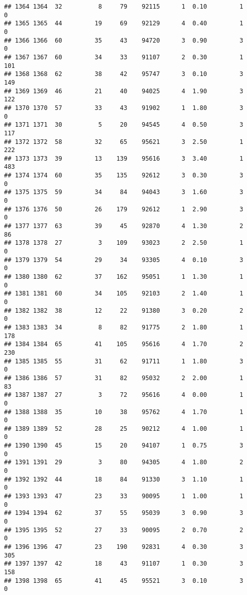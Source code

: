 \documentclass[
]{article}
\begin{document}
\begin{verbatim}
## 1364 1364  32          8     79    92115      1  0.10         1        0
## 1365 1365  44         19     69    92129      4  0.40         1        0
## 1366 1366  60         35     43    94720      3  0.90         3        0
## 1367 1367  60         34     33    91107      2  0.30         1      101
## 1368 1368  62         38     42    95747      3  0.10         3      149
## 1369 1369  46         21     40    94025      4  1.90         3      122
## 1370 1370  57         33     43    91902      1  1.80         3        0
## 1371 1371  30          5     20    94545      4  0.50         3      117
## 1372 1372  58         32     65    95621      3  2.50         1      222
## 1373 1373  39         13    139    95616      3  3.40         1      483
## 1374 1374  60         35    135    92612      3  0.30         3        0
## 1375 1375  59         34     84    94043      3  1.60         3        0
## 1376 1376  50         26    179    92612      1  2.90         3        0
## 1377 1377  63         39     45    92870      4  1.30         2       86
## 1378 1378  27          3    109    93023      2  2.50         1        0
## 1379 1379  54         29     34    93305      4  0.10         3        0
## 1380 1380  62         37    162    95051      1  1.30         1        0
## 1381 1381  60         34    105    92103      2  1.40         1        0
## 1382 1382  38         12     22    91380      3  0.20         2        0
## 1383 1383  34          8     82    91775      2  1.80         1      178
## 1384 1384  65         41    105    95616      4  1.70         2      230
## 1385 1385  55         31     62    91711      1  1.80         3        0
## 1386 1386  57         31     82    95032      2  2.00         1       83
## 1387 1387  27          3     72    95616      4  0.00         1        0
## 1388 1388  35         10     38    95762      4  1.70         1        0
## 1389 1389  52         28     25    90212      4  1.00         1        0
## 1390 1390  45         15     20    94107      1  0.75         3        0
## 1391 1391  29          3     80    94305      4  1.80         2        0
## 1392 1392  44         18     84    91330      3  1.10         1        0
## 1393 1393  47         23     33    90095      1  1.00         1        0
## 1394 1394  62         37     55    95039      3  0.90         3        0
## 1395 1395  52         27     33    90095      2  0.70         2        0
## 1396 1396  47         23    190    92831      4  0.30         3      305
## 1397 1397  42         18     43    91107      1  0.30         3      158
## 1398 1398  65         41     45    95521      3  0.10         3        0

\end{verbatim}
\end{document}
